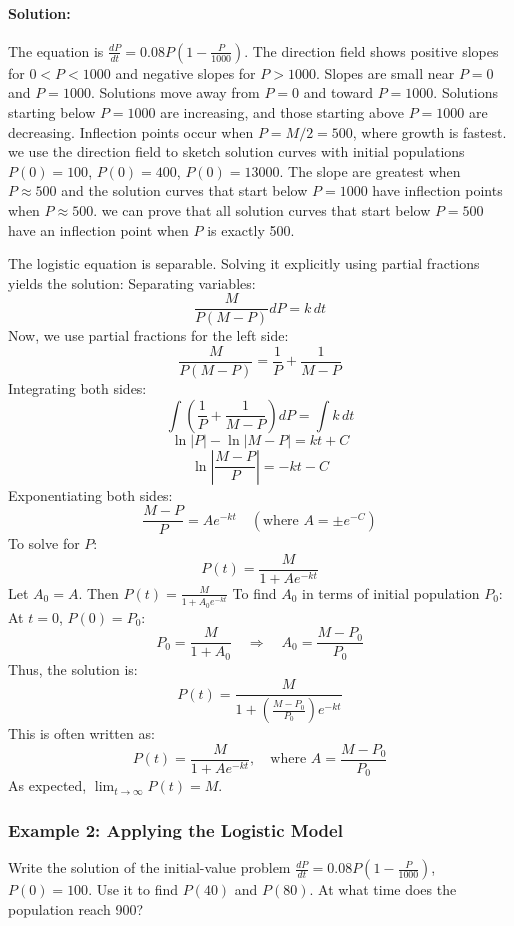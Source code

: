 \documentclass{article}
\begin{document}
\paragraph{Solution:}
The equation is $\frac{dP}{dt} = 0.08P\left(1 - \frac{P}{1000}\right)$.
The direction field shows positive slopes for $0 < P < 1000$ and negative slopes for $P > 1000$.
Slopes are small near $P=0$ and $P=1000$. Solutions move away from $P=0$ and toward $P=1000$.
Solutions starting below $P=1000$ are increasing, and those starting above $P=1000$ are decreasing. 
Inflection points occur when $P=M/2=500$, where growth is fastest.
we use the direction field to sketch solution curves with initial populations $P(0)=100$, $P(0)=400$, $P(0)=13000$.
The slope are greatest when $P \approx 500$ and the solution curves that start below $P=1000$ have inflection points when $P \approx 500$. 
we can prove that all solution curves that start below $P=500$ have an inflection point when $P$ is exactly 500.

The logistic equation is separable. 
Solving it explicitly using partial fractions yields the solution:
Separating variables:
\[
\frac{M}{P(M - P)} dP = k \, dt
\]
Now, we use partial fractions for the left side:
\[
\frac{M}{P(M - P)} = \frac{1}{P} + \frac{1}{M - P}
\]
Integrating both sides:
\[
\int \left(\frac{1}{P} + \frac{1}{M - P}\right) dP = \int k \, dt
\]
\[
\ln|P| - \ln|M - P| = kt + C
\]
\[
\ln\left|\frac{M - P}{P}\right| = -kt - C
\]
Exponentiating both sides:
\[
\frac{M - P}{P} = A e^{-kt} \quad (\text{where } A = \pm e^{-C})
\]
To solve for $P$:
\[
P(t) = \frac{M}{1 + A e^{-kt}}
\]
Let $A_0 = A$. Then $P(t) = \frac{M}{1 + A_0 e^{-kt}}$
To find $A_0$ in terms of initial population $P_0$:
At $t=0$, $P(0) = P_0$:
\[
P_0 = \frac{M}{1 + A_0} \quad \Rightarrow \quad A_0 = \frac{M - P_0}{P_0}
\]
Thus, the solution is:
\[
P(t) = \frac{M}{1 + \left(\frac{M - P_0}{P_0}\right) e^{-kt}}
\]
This is often written as:
\[
P(t) = \frac{M}{1 + A e^{-kt}}, \quad \text{where } A = \frac{M - P_0}{P_0}
\]
As expected, $\lim_{t \to \infty} P(t) = M$.

\subsubsection*{Example 2: Applying the Logistic Model}
Write the solution of the initial-value problem $\frac{dP}{dt} = 0.08P\left(1 - \frac{P}{1000}\right)$, $P(0) = 100$. Use it to find $P(40)$ and $P(80)$. At what time does the population reach 900?
\end{document}
